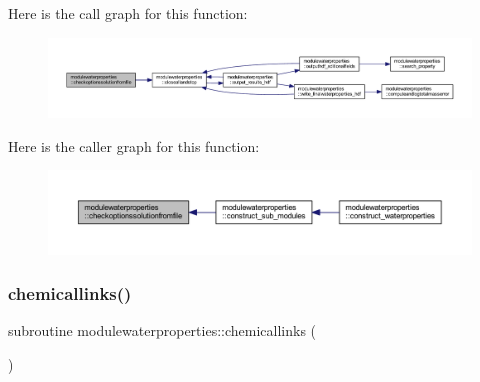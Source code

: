 Here is the call graph for this function\+:\nopagebreak
\begin{figure}[H]
\begin{center}
\leavevmode
\includegraphics[width=350pt]{namespacemodulewaterproperties_a57c8ab92e75b6233d379f6d614bdd148_cgraph}
\end{center}
\end{figure}
Here is the caller graph for this function\+:\nopagebreak
\begin{figure}[H]
\begin{center}
\leavevmode
\includegraphics[width=350pt]{namespacemodulewaterproperties_a57c8ab92e75b6233d379f6d614bdd148_icgraph}
\end{center}
\end{figure}
\mbox{\label{namespacemodulewaterproperties_af5a9b4a5acf0da8a86fcabea8bf09f28}} 
\subsubsection{\texorpdfstring{chemicallinks()}{chemicallinks()}}
{\footnotesize\ttfamily subroutine modulewaterproperties\+::chemicallinks (\begin{DoxyParamCaption}{ }\end{DoxyParamCaption})\hspace{0.3cm}{\ttfamily [private]}}

